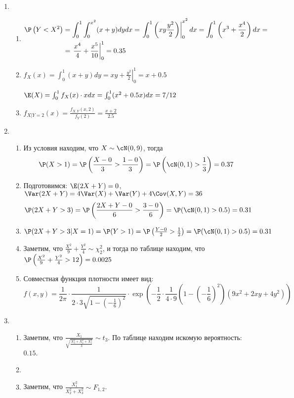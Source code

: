 \begin{enumerate}
\item
\begin{enumerate}
\item
\begin{align*}
\P\left(Y<X^2\right) &= \int_0^1 \int_0^{x^2} (x+y) dy dx = \left. \int_0^1 \left(xy \frac{y^2}{2} \right) \right|_0^{x^2} dx =  \int_0^1 \left(x^3 + \frac{x^4}{2} \right) dx = \\
&= \left. \frac{x^4}{4} + \frac{x^5}{10} \right|_0^1 = 0.35
\end{align*}
\item $f_X (x) = \int_0^1 (x+y) dy = \left. xy + \frac{y^2}{2} \right|_0^1 = x + 0.5$

$\E(X) = \int_0^1 f_X (x) \cdot x dx = \int_0^1 (x^2 + 0.5x) dx = 7/12$
\item $f_{X|Y=2}(x) = \frac{f_{X, Y}(x, 2)}{f_Y (2)} = \frac{x+2}{2.5}$
\end{enumerate}
\item
\begin{enumerate}
\item Из условия находим, что $X \sim \cN (0, 9)$, тогда
\[
\P(X>1) = \P \left(\frac{X-0}{3} > \frac{1-0}{3} \right) = \P\left(\cN(0,1) > \frac{1}{3} \right) = 0.37
\]
\item Подготовимся: $\E(2X+Y) = 0$, $\Var(2X+Y) = 4\Var(X) + \Var(Y) + 4 \Cov(X, Y) = 36$
\[
\P(2X+Y > 3) = \P\left(\frac{2X+Y-0}{6} > \frac{3-0}{6} \right) = \P(\cN(0, 1) > 0.5) = 0.31
\]
\item $ \P(2X+Y > 3 | X=1) = \P(Y > 1) = \P \left(\frac{Y-0}{2} > \frac{1}{2} \right) = \P(\cN(0, 1) > 0.5) = 0.31$
\item Заметим, что $\frac{X^2}{9}+\frac{Y^2}{4} \sim \chi^2_2$,
и тогда по таблице находим, что $\P\left(\frac{X^2}{9}+\frac{Y^2}{4} >12\right) = 0.0025$
\item Совместная функция плотности имеет вид:
\[
f(x, y) = \frac{1}{2\pi}\cdot \frac{1}{2\cdot 3\sqrt{1- \left(-\frac{1}{6}\right)^2}}\cdot \exp \left(- \frac{1}{2} \cdot \frac{1}{4\cdot9} \left(1- \left(-\frac{1}{6}\right)^2\right) \left(9x^2 + 2xy + 4y^2 \right) \right)
\]
\end{enumerate}
\item
\begin{enumerate}
\item Заметим, что $\frac{X_1}{\sqrt{\frac{X_3^2+X_4^2+X_5^2}{3}}} \sim t_3$.
По таблице находим искомую вероятность: $0.15$.
\item
\item Заметим, что $\frac{X_1^2}{X_2^2+X_3^2} \sim F_{1, 2}$.

\end{enumerate}
\end{enumerate}

